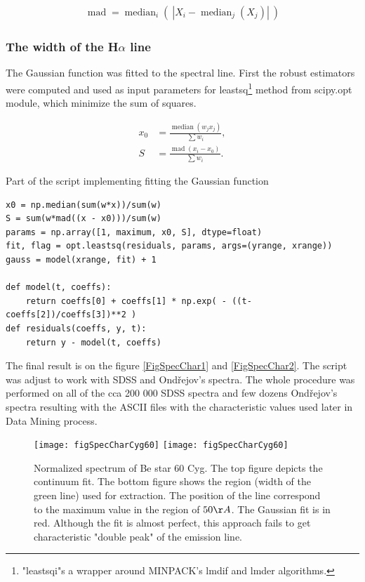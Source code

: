 \begin{align}
  \operatorname{mad} = \operatorname{median}_{i}\left(\ \left| X_{i} -
      \operatorname{median}_{j} (X_{j}) \right|\ \right)
\end{align}

\subsubsection{The width of the H$\alpha$ line}
The Gaussian function was fitted to the spectral line. First the
robust estimators were computed and used as input parameters for
leastsq\footnote{"leastsqi"s a wrapper around MINPACK’s lmdif and
  lmder algorithms.} method from scipy.opt module, which minimize the
sum of squares.

\begin{align}
  x_0 & = \frac{\operatorname{median}(w_jx_j)}{\sum{w_i}}, \\
  S & = \frac{\operatorname{mad}(x_i - x_0)}{\sum{w_i}}.
\end{align}

\citep{launer1979robustness}

Part of the script implementing fitting the Gaussian function

\begin{lstlisting}
x0 = np.median(sum(w*x))/sum(w)
S = sum(w*mad((x - x0)))/sum(w)
params = np.array([1, maximum, x0, S], dtype=float)
fit, flag = opt.leastsq(residuals, params, args=(yrange, xrange))
gauss = model(xrange, fit) + 1

def model(t, coeffs):
    return coeffs[0] + coeffs[1] * np.exp( - ((t-coeffs[2])/coeffs[3])**2 )
def residuals(coeffs, y, t):
    return y - model(t, coeffs)
\end{lstlisting}

The final result is on the figure \ref{FigSpecChar1} and
\ref{FigSpecChar2}. The script was adjust to work with SDSS and
Ondřejov's spectra. The whole procedure was performed on all of the
cca 200 000 SDSS spectra and few dozens Ondřejov's spectra resulting
with the ASCII files with the characteristic values used later in Data
Mining process.

   \begin{figure}[!htbp]
      \begin{center}
        \leavevmode
        \ifpdf
        \texttt{[image: figSpecCharCyg60]}
        \else
        \texttt{[image: figSpecCharCyg60]}
        \fi
        \caption{Normalized spectrum of Be star 60 Cyg. The top figure
          depicts the continuum fit. The bottom figure shows the
          region (width of the green line) used for extraction. The
          position of the line correspond to the maximum value in the
          region of $50\AA$. The Gaussian fit is in red. Although the
          fit is almost perfect, this approach fails to get
          characteristic "double peak" of the emission line. }
        \label{FigSpecChar}
      \end{center}
    \end{figure}


